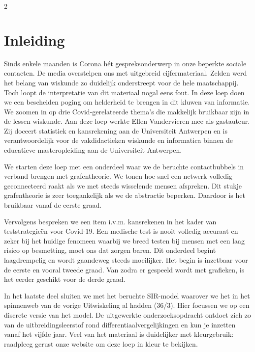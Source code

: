 \startcontents[mainsections]		      %
\begin{multicols}{2}                      
\inhoudstafelLoep		                  %




\section{Inleiding}
Sinds enkele maanden is Corona hét gespreksonderwerp in onze beperkte sociale contacten. De media overstelpen ons met uitgebreid cijfermateriaal. Zelden werd het belang van wiskunde zo duidelijk onderstreept voor de hele maatschappij. Toch loopt de interpretatie van dit materiaal nogal eens fout. In deze loep doen we een bescheiden poging om helderheid te brengen in dit kluwen van informatie. We zoomen in op drie Covid-gerelateerde thema's die makkelijk bruikbaar zijn in de lessen wiskunde. Aan deze loep werkte Ellen Vandervieren mee als gastauteur. Zij doceert statistiek en kansrekening aan de Universiteit Antwerpen en is verantwoordelijk voor de vakdidactieken wiskunde en informatica binnen de educatieve masteropleiding aan de Universiteit Antwerpen. 

We starten deze loep met een onderdeel waar we de beruchte contactbubbels in verband brengen met grafentheorie. We tonen hoe snel een netwerk volledig geconnecteerd raakt als we met steeds wisselende mensen afspreken. Dit stukje grafentheorie is zeer toegankelijk als we de abstractie beperken. Daardoor is het bruikbaar vanaf de eerste graad. 

Vervolgens bespreken we een item i.v.m. kansrekenen in het kader van teststrategieën voor Covid-19. Een medische test is nooit volledig accuraat en zeker bij het huidige fenomeen waarbij we breed testen bij mensen met een laag risico op besmetting, moet ons dat zorgen baren. Dit onderdeel begint laagdrempelig en wordt gaandeweg steeds moeilijker. Het begin is inzetbaar voor de eerste en vooral tweede graad. Van zodra er gespeeld wordt met grafieken, is het eerder geschikt voor de derde graad. 

In het laatste deel sluiten we met het beruchte SIR-model waarover we het in het spinnenweb van de vorige Uitwiskeling al hadden (36/3). Hier focussen we op een discrete versie van het model. De uitgewerkte onderzoeksopdracht ontdoet zich zo van de uitbreidingsleerstof rond differentiaalvergelijkingen en kun je inzetten vanaf het vijfde jaar. Veel van het materiaal is duidelijker met kleurgebruik: raadpleeg gerust onze website om deze loep in kleur te bekijken. 


\end{multicols}
